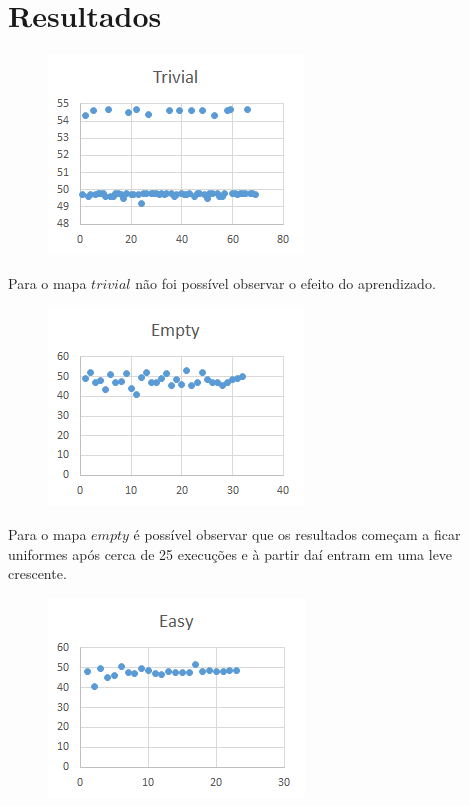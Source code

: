 \documentclass[letterpaper]{article}
\begin{document}
\section{Resultados}

\begin{figure}[ht]
\includegraphics{trivial}\\
\centering
\end{figure}

Para o mapa $trivial$ não foi possível observar o efeito do aprendizado.

\begin{figure}[ht]
\includegraphics{empty}\\
\centering
\end{figure}

Para o mapa $empty$ é possível observar que os resultados começam a ficar uniformes após cerca de 25 execuções e à partir daí entram em uma leve crescente.

\begin{figure}[ht]
\includegraphics{easy}
\centering
\end{figure}
\end{document}
